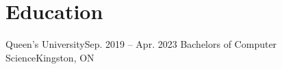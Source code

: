 \section{Education}
    \resumeSubHeadingListStart
    \resumeSubheading
    {Queen's University}{Sep. 2019 -- Apr. 2023}
    {Bachelors of Computer Science}{Kingston, ON}
    \resumeSubHeadingListEnd